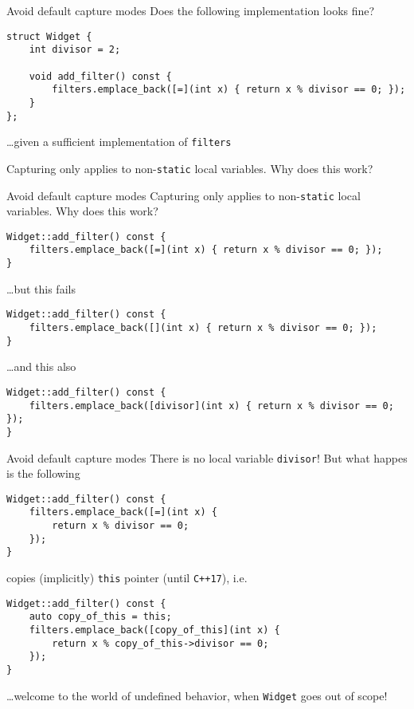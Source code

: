 \begin{frame}[fragile]{Avoid default capture modes}
    Does the following implementation looks fine?
    \begin{lstlisting}
struct Widget {
    int divisor = 2;

    void add_filter() const {
        filters.emplace_back([=](int x) { return x % divisor == 0; });
    }
};
    \end{lstlisting}
    \hfill \ldots given a sufficient implementation of \texttt{filters}

    Capturing only applies to non-\texttt{static} local variables. Why does this work?
\end{frame}

\begin{frame}[fragile]{Avoid default capture modes}
    Capturing only applies to non-\texttt{static} local variables. Why does this work?
    \begin{lstlisting}
Widget::add_filter() const {
    filters.emplace_back([=](int x) { return x % divisor == 0; });
}
    \end{lstlisting}
    \ldots but this fails
    \begin{lstlisting}
Widget::add_filter() const {
    filters.emplace_back([](int x) { return x % divisor == 0; });
}
    \end{lstlisting}

    \ldots and this also
    \begin{lstlisting}
Widget::add_filter() const {
    filters.emplace_back([divisor](int x) { return x % divisor == 0; });
}
    \end{lstlisting}
\end{frame}

\begin{frame}[fragile]{Avoid default capture modes}
    There is no local variable \texttt{divisor}! But what happes is the following
    \begin{lstlisting}
Widget::add_filter() const {
    filters.emplace_back([=](int x) {
        return x % divisor == 0;
    });
}
    \end{lstlisting}
    copies (implicitly) \texttt{this} pointer (\textcolor{vertexDarkRed}{until \texttt{C++17}}), i.e.
    \begin{lstlisting}    
Widget::add_filter() const {
    auto copy_of_this = this;
    filters.emplace_back([copy_of_this](int x) {
        return x % copy_of_this->divisor == 0;
    });
}
    \end{lstlisting}

    \ldots welcome to the world of undefined behavior, when \texttt{Widget} goes out of scope!
\end{frame}

